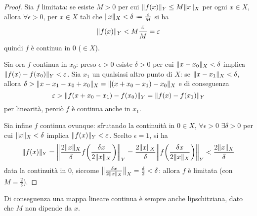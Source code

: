 \begin{proof}
    Sia $f$ limitata: se esiste $M>0$ per cui $\norm{f(x)}_Y\le M\norm{x}_X$ per ogni $x\in X$, allora $\forall\epsilon>0$, per $x\in X$ tali che $\norm{x}_X<\delta\defeq\frac{\epsilon}{M}$ si ha
    \begin{equation}
        \norm{f(x)}_Y<M\frac{\epsilon}{M}=\epsilon
    \end{equation}
    quindi $f$ è continua in $0$ ($\in X$).

    Sia ora $f$ continua in $x_0$: preso $\epsilon>0$ esiste $\delta>0$ per cui $\norm{x-x_0}_X<\delta$ implica $\norm{f(x)-f(x_0)}_Y<\epsilon$.
    Sia $x_1$ un qualsiasi altro punto di $X$: se $\norm{x-x_1}_X<\delta$, allora $\delta>\norm{x-x_1-x_0+x_0}_X=\norm{(x+x_0-x_1)-x_0}_X$ e di conseguenza
    \begin{equation}
        \epsilon>\norm{f(x+x_0-x_1)-f(x_0)}_Y=
        \norm{f(x)-f(x_1)}_Y
    \end{equation}
    per linearità, perciò $f$ è continua anche in $x_1$.

    Sia infine $f$ continua ovunque: sfrutando la continuità in $0\in X$, $\forall\epsilon>0$ $\exists\delta>0$ per cui $\norm{x}_X<\delta$ implica $\norm{f(x)}_Y<\epsilon$.
    Scelto $\epsilon=1$, si ha
    \begin{equation}
        \norm{f(x)}_Y=
        \norm[\bigg]{\frac{2\norm{x}_X}{\delta}f\biggl(\frac{\delta x}{2\norm{x}_X}\biggr)}_Y=
        \frac{2\norm{x}_X}{\delta}\norm[\bigg]{f\biggl(\frac{\delta x}{2\norm{x}_X}\biggr)}_Y<
        \frac{2\norm{x}_X}{\delta}
    \end{equation}
    data la continuità in $0$, siccome $\norm[\big]{\frac{\delta x}{2\norm{x}_X}}_X=\frac{\delta}2<\delta$: allora $f$ è limitata (con $M=\frac2{\delta}$).
\end{proof}
Di conseguenza una mappa lineare continua è sempre anche lipschitziana, dato che $M$ non dipende da $x$.

